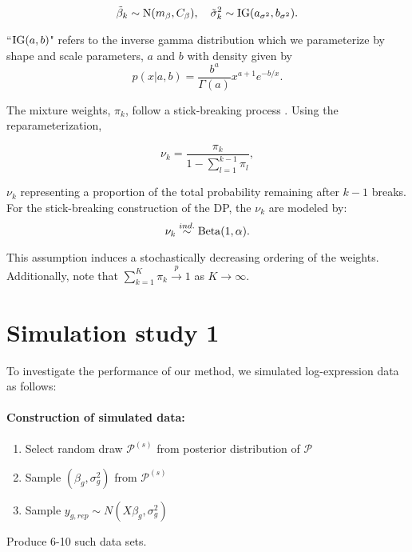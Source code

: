 \begin{equation}
\tilde{\beta}_k \sim \operatorname{N}(m_\beta, C_\beta),\quad \tilde{\sigma}^2_k \sim \operatorname{IG}(a_{\sigma^2}, b_{\sigma^2}).
\end{equation}

``$\operatorname{IG}(a,b)$" refers to the inverse gamma distribution which we parameterize by shape and scale parameters, $a$ and $b$ with density given by
\begin{equation*}
p(x|a,b) = \frac{b^a}{\Gamma(a)}x^{a+1}e^{-b/x}.
\end{equation*}


The mixture weights, $\pi_k$,  follow a stick-breaking process \cite{sethuraman}. Using the reparameterization,

\begin{equation}
\nu_k = \frac{\pi_k}{1 - \sum_{l=1}^{k-1} \pi_l},
\end{equation}

$\nu_k$ representing a proportion of the total probability remaining after $k-1$ breaks. For the stick-breaking construction of the DP, the $\nu_k$ are modeled by:
\begin{equation}
\nu_k \stackrel{ind.}{\sim} \operatorname{Beta}(1, \alpha).
\end{equation}

This assumption induces a stochastically decreasing ordering of the weights. Additionally, note that $\sum_{k=1}^K \pi_k \stackrel{p}{\rightarrow} 1$ as $K\rightarrow \infty$. 

\section{Simulation study 1}
To investigate the performance of our method, we simulated log-expression data as follows:

\paragraph{Construction of simulated data:}
\begin{enumerate}
\item Select random draw $\mathcal{P}^{(s)}$ from posterior distribution of $\mathcal{P}$

\item Sample $(\beta_g,\sigma^2_g)$ from $\mathcal{P}^{(s)}$

\item Sample $y_{g,rep} \sim N(X\beta_g,\sigma^2_g)$
\end{enumerate}
Produce 6-10 such data sets.\\




